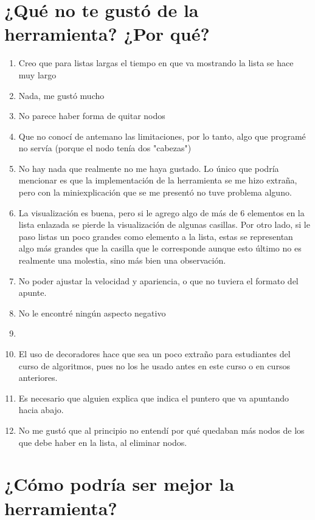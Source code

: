 \section{¿Qué no te gustó de la herramienta? ¿Por qué?}

\begin{enumerate}
    \item Creo que para listas largas el tiempo en que va mostrando la lista se hace muy largo
    \item Nada, me gustó mucho
    \item No parece haber forma de quitar nodos
    \item Que no conocí de antemano las limitaciones, por lo tanto, algo que programé no servía (porque el nodo tenía dos "cabezas")
    \item No hay nada que realmente no me haya gustado. Lo único que podría mencionar es que la implementación de la herramienta se me hizo extraña, pero con la miniexplicación que se me presentó no tuve problema alguno.
    \item La visualización es buena, pero si le agrego algo de más de 6 elementos en la lista enlazada se pierde la visualización de algunas casillas. Por otro lado, si le paso listas un poco grandes como elemento a la lista, estas se representan algo más grandes que la casilla que le corresponde aunque esto último no es realmente una molestia, sino más bien una observación.
    \item No poder ajustar la velocidad y apariencia, o que no tuviera el formato del apunte.
    \item No le encontré ningún aspecto negativo
    \item 
    \item El uso de decoradores hace que sea un poco extraño para estudiantes del curso de algoritmos, pues no los he usado antes en este curso o en cursos anteriores.
    \item Es necesario que alguien explica que indica el puntero que va apuntando hacia abajo.
    \item No me gustó que al principio no entendí por qué quedaban más nodos de los que debe haber en la lista, al eliminar nodos.
\end{enumerate}

\section{¿Cómo podría ser mejor la herramienta?}

